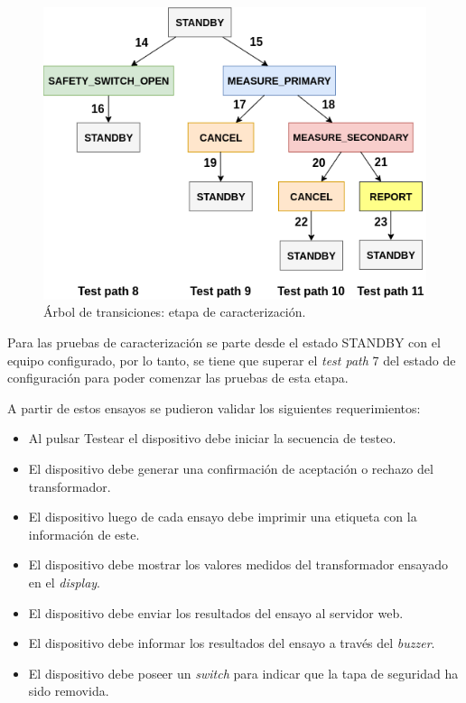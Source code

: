 \begin{figure}[htpb]
	\centering
	\includegraphics[scale=0.95]{./Figures/ArTrans_3.png}
	\caption{Árbol de transiciones: etapa de caracterización.}
	\label{fig:ArTrans_3}
\end{figure}

Para las pruebas de caracterización se parte desde el estado STANDBY con el equipo configurado, por lo tanto, se tiene que superar el \textit{test path} 7 del estado de configuración para poder comenzar las pruebas de esta etapa.

\pagebreak

A partir de estos ensayos se pudieron validar los siguientes requerimientos: 
\begin{itemize}
	\item Al pulsar Testear el dispositivo debe iniciar la secuencia de testeo.
	\item El dispositivo debe generar una confirmación de aceptación o rechazo del transformador.
	\item El dispositivo luego de cada ensayo debe imprimir una etiqueta con la información de este.
	\item El dispositivo debe mostrar los valores medidos del transformador ensayado en el \textit{display}.
	\item El dispositivo debe enviar los resultados del ensayo al servidor web.
	\item El dispositivo debe informar los resultados del ensayo a través del \textit{buzzer}.
	\item El dispositivo debe poseer un \textit{switch} para indicar que la tapa de seguridad ha sido removida.
\end{itemize}


